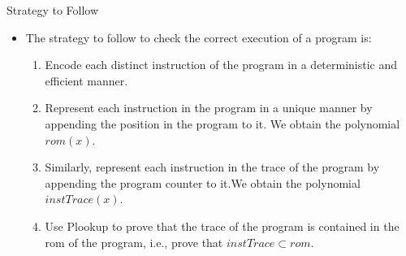 \begin{frame}{Strategy to Follow}
\begin{itemize}
\item The strategy to follow to check the correct execution of a program is:
\begin{enumerate}
\item Encode each distinct instruction of the program in a deterministic and efficient manner.

\item Represent each instruction in the program in a unique manner by appending the position in the program to it. We obtain the polynomial $rom(x)$.

\item Similarly, represent each instruction in the trace of the program by appending the program counter to it.We obtain the polynomial $instTrace(x)$.

\item Use Plookup to prove that the trace of the program is contained in the rom of the program, i.e., prove that $instTrace \subset rom$.
\end{enumerate}
\end{itemize}
\end{frame}
















